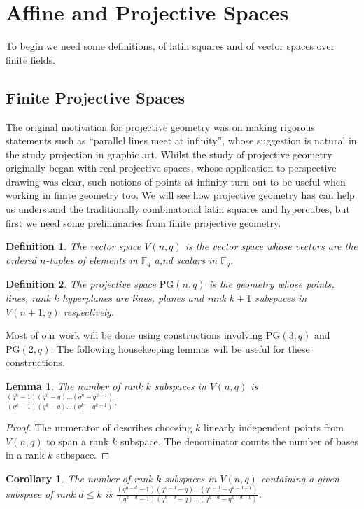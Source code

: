 \documentclass{article}
\newtheorem{lemma}{Lemma}
\newtheorem{corollary}{Corollary}
\newtheorem{definition}{Definition}
\newcommand{\PG}{\mathrm{PG}}
\begin{document}
\section{Affine and Projective Spaces}
To begin we need some definitions, of latin squares and of vector spaces over finite fields.

\subsection{Finite Projective Spaces}

The original motivation for projective geometry was on making rigorous
statements such as “parallel lines meet at infinity”, whose suggestion is
natural in the study projection in graphic art. Whilst the study of projective geometry originally
began with real projective spaces, whose application to perspective drawing was
clear, such notions of points at infinity turn out to be useful when working in
finite geometry too. We will see how projective geometry has can help us understand the
traditionally combinatorial latin squares and hypercubes, but first we need some
preliminaries from finite projective geometry.

\begin{definition}
  The vector space \(V(n, q)\) is the vector space whose vectors are the ordered \(n\)-tuples of elements in \(\mathbb{F}_q\) a,nd scalars in \(\mathbb{F}_q\).
\end{definition}

\begin{definition}
  The projective space \(\PG(n, q)\) is the geometry whose points, lines, rank \(k\) hyperplanes are lines, planes and rank \(k + 1\) subspaces in \(V(n + 1, q)\) respectively.
\end{definition}

Most of our work will be done using constructions involving \(\PG(3, q)\) and \(\PG(2, q)\). The following housekeeping lemmas will be useful for these constructions.

\begin{lemma}\label{lemma:1}
  The number of rank \(k\) subspaces in \(V(n, q)\) is \(\frac{(q^n - 1)(q^n - q)\ldots (q^n - q^{k - 1})}{(q^k - 1)(q^k - q)\ldots (q^k - q^{k - 1})}\).
\end{lemma}
\begin{proof}
  The numerator of describes choosing \(k\) linearly independent points from \(V(n, q)\) to span a rank \(k\) subspace. The denominator counts the number of bases in a rank \(k\) subspace.
\end{proof}
\begin{corollary}
  The number of rank \(k\) subspaces in \(V(n, q)\) containing a given subspace of rank \(d \leq k\) is
  \(\frac{(q^{n - d} - 1)(q^{n - d} - q) \ldots (q^{n - d} - q^{k - d - 1})}{(q^{k - d} - 1) (q^{k - d} - q) \ldots (q^{k - d} - q^{k - d - 1})}\).
\end{corollary}
\end{document}
